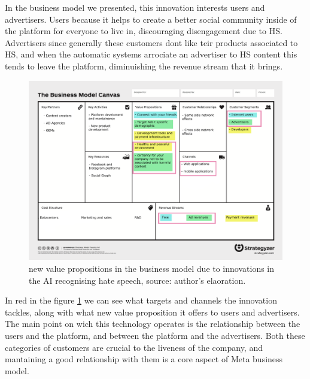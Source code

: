 In the business model we presented, this innovation interests users
and advertisers. Users because it helps to create a better social
community inside of the platform for everyone to live in, discouraging
disengagement due to HS. Advertisers since generally these
customers dont like teir products associated to HS, and when
the automatic systems arrociate an advertiser to HS content this tends
to leave the platform, diminuishing the revenue stream that it brings.

\begin{figure}[ht]
  \centering \includegraphics[width=.8\textwidth]{images/newcanvas}
  \caption{new value propositions in the business model due to
    innovations in the AI recognising hate speech, source: author's
    elaoration.}
  \label{fig:newcanvas}
\end{figure}

In red in the figure \ref{fig:newcanvas} we can see what targets and
channels the innovation tackles, along with what new value proposition
it offers to users and advertisers. The main point on wich this
technology operates is the relationship between the users and the
platform, and between the platform and the advertisers. Both these
categories of customers are crucial to the liveness of the company,
and mantaining a good relationship with them is a core aspect of Meta
business model.
